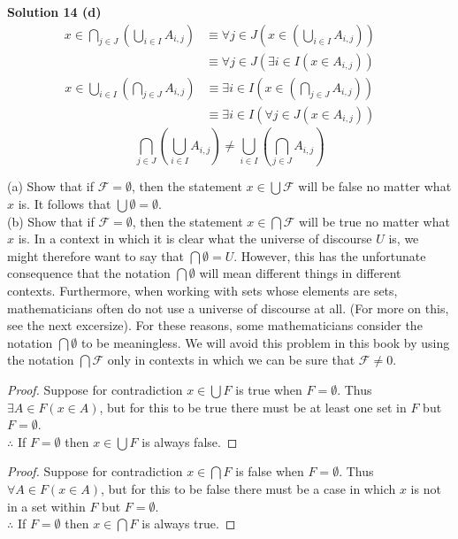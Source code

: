 \textbf{Solution 14 (d)} \\
\begin{align*}
    x \in \bigcap_{j \in J}\left(\bigcup_{i \in I} A_{i, j}\right)
        &\equiv \forall{j \in J}\left(x \in \left(\bigcup_{i \in I} A_{i, j}\right)\right) && \\
        &\equiv \forall{j \in J}(\exists{i \in I}(x \in A_{i, j}))
\end{align*}
\begin{align*}
    x \in \bigcup_{i \in I}\left(\bigcap_{j \in J} A_{i, j}\right)
        &\equiv \exists{i \in I}\left(x \in \left(\bigcap_{j \in J} A_{i, j}\right)\right) && \\
        &\equiv \exists{i \in I}(\forall{j \in J}(x \in A_{i, j}))
\end{align*}
\[\bigcap_{j \in J}\left(\bigcup_{i \in I} A_{i, j}\right) \not = \bigcup_{i \in I}\left(\bigcap_{j \in J} A_{i, j}\right)\]

\begin{tcolorbox}[title=Problem 15, breakable]
    (a) Show that if $\mathcal{F} = \emptyset$, then the statement $x \in \bigcup \mathcal{F}$ will be false
        no matter what $x$ is. It follows that $\bigcup \emptyset = \emptyset$. \\
    (b) Show that if $\mathcal{F} = \emptyset$, then the statement $x \in \bigcap\mathcal{F}$ will be true
        no matter what $x$ is. In a context in which it is clear what the universe of discourse $U$ is,
        we might therefore want to say that $\bigcap \emptyset = U$. However, this has the unfortunate 
        consequence that the notation $\bigcap \emptyset$ will mean different things in different contexts.
        Furthermore, when working with sets whose elements are sets, mathematicians  often do not use a 
        universe of discourse  at all. (For more on this, see the next excersize). For these reasons, some
        mathematicians consider the notation $\bigcap \emptyset$ to be meaningless. We will avoid this problem
        in this book by using the notation $\bigcap \mathcal{F}$ only in contexts in which we can be sure 
        that $\mathcal{F} \not = 0$.
\end{tcolorbox}

\begin{proof}
    Suppose for contradiction $x \in \bigcup F$ is true when $F = \emptyset$.
    Thus $\exists{A \in F}(x \in A)$, but for this to be true there must be at least
    one set in $F$ but $F = \emptyset$. \\ 
    $\therefore$ If $F = \emptyset$ then $x \in \bigcup F$ is always false.
\end{proof}
\begin{proof}
    Suppose for contradiction $x \in \bigcap F$ is false when $F = \emptyset$.
    Thus $\forall{A \in F}(x \in A)$, but for this to be false there must be a case in which $x$ 
    is not in a set within $F$ but $F = \emptyset$. \\
    $\therefore$ If $F = \emptyset$ then $x \in \bigcap F$ is always true.
\end{proof}

